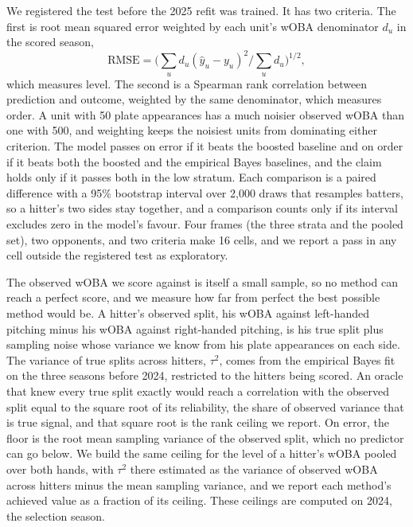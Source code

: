 \documentclass[11pt,letterpaper]{article}
\begin{document}
We registered the test before the 2025 refit was trained. It has two criteria. The first is root mean squared error weighted by each unit's wOBA denominator $d_u$ in the scored season,
\begin{equation}
\text{RMSE} = \Big( \sum_u d_u (\hat y_u - y_u)^2 \Big/ \sum_u d_u \Big)^{1/2},
\label{eq:rmse}
\end{equation}
which measures level. The second is a Spearman rank correlation between prediction and outcome, weighted by the same denominator, which measures order. A unit with 50 plate appearances has a much noisier observed wOBA than one with 500, and weighting keeps the noisiest units from dominating either criterion. The model passes on error if it beats the boosted baseline and on order if it beats both the boosted and the empirical Bayes baselines, and the claim holds only if it passes both in the low stratum. Each comparison is a paired difference with a 95\% bootstrap interval over 2,000 draws that resamples batters, so a hitter's two sides stay together, and a comparison counts only if its interval excludes zero in the model's favour. Four frames (the three strata and the pooled set), two opponents, and two criteria make 16 cells, and we report a pass in any cell outside the registered test as exploratory.

The observed wOBA we score against is itself a small sample, so no method can reach a perfect score, and we measure how far from perfect the best possible method would be. A hitter's observed split, his wOBA against left-handed pitching minus his wOBA against right-handed pitching, is his true split plus sampling noise whose variance we know from his plate appearances on each side. The variance of true splits across hitters, $\tau^2$, comes from the empirical Bayes fit on the three seasons before 2024, restricted to the hitters being scored. An oracle that knew every true split exactly would reach a correlation with the observed split equal to the square root of its reliability, the share of observed variance that is true signal, and that square root is the rank ceiling we report. On error, the floor is the root mean sampling variance of the observed split, which no predictor can go below. We build the same ceiling for the level of a hitter's wOBA pooled over both hands, with $\tau^2$ there estimated as the variance of observed wOBA across hitters minus the mean sampling variance, and we report each method's achieved value as a fraction of its ceiling. These ceilings are computed on 2024, the selection season.
\end{document}
